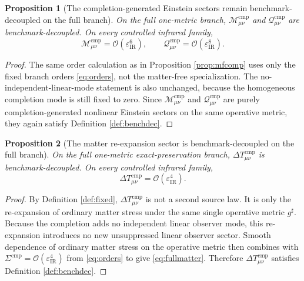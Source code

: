 \documentclass[11pt]{article}
\newcommand{\CompletedMetric}{g^{\sharp}}
\newcommand{\CompShift}{\Sigma^{\mathrm{cmp}}}
\newcommand{\CompMix}{\mathcal M_{\mu\nu}^{\mathrm{cmp}}}
\newcommand{\CompQuad}{\mathcal Q_{\mu\nu}^{\mathrm{cmp}}}
\newcommand{\DeltaTComp}{\Delta T_{\mu\nu}^{\mathrm{cmp}}}
\newcommand{\epsIR}{\varepsilon_{\mathrm{IR}}}
\newtheorem{proposition}{Proposition}
\begin{document}
\begin{proposition}[The completion-generated Einstein sectors remain benchmark-decoupled on the full branch]
\label{prop:fullcomp}
On the full one-metric branch, \(\CompMix\) and \(\CompQuad\) are benchmark-decoupled. On every controlled infrared family,
\begin{equation}
\CompMix=\mathcal O(\epsIR^6),
\qquad
\CompQuad=\mathcal O(\epsIR^8).
\label{eq:fullcomp}
\end{equation}
\end{proposition}

\begin{proof}
The same order calculation as in Proposition \ref{prop:mfcomp} uses only the fixed branch orders \eqref{eq:orders}, not the matter-free specialization. The no-independent-linear-mode statement is also unchanged, because the homogeneous completion mode is still fixed to zero. Since \(\CompMix\) and \(\CompQuad\) are purely completion-generated nonlinear Einstein sectors on the same operative metric, they again satisfy Definition \ref{def:benchdec}.
\end{proof}

\begin{proposition}[The matter re-expansion sector is benchmark-decoupled on the full branch]
\label{prop:fullmatter}
On the full one-metric exact-preservation branch, \(\DeltaTComp\) is benchmark-decoupled. On every controlled infrared family,
\begin{equation}
\DeltaTComp=\mathcal O(\epsIR^4).
\label{eq:fullmatter}
\end{equation}
\end{proposition}

\begin{proof}
By Definition \ref{def:fixed}, \(\DeltaTComp\) is not a second source law. It is only the re-expansion of ordinary matter stress under the same single operative metric \(\CompletedMetric\). Because the completion adds no independent linear observer mode, this re-expansion introduces no new unsuppressed linear observer sector. Smooth dependence of ordinary matter stress on the operative metric then combines with \(\CompShift=\mathcal O(\epsIR^4)\) from \eqref{eq:orders} to give \eqref{eq:fullmatter}. Therefore \(\DeltaTComp\) satisfies Definition \ref{def:benchdec}.
\end{proof}
\end{document}
